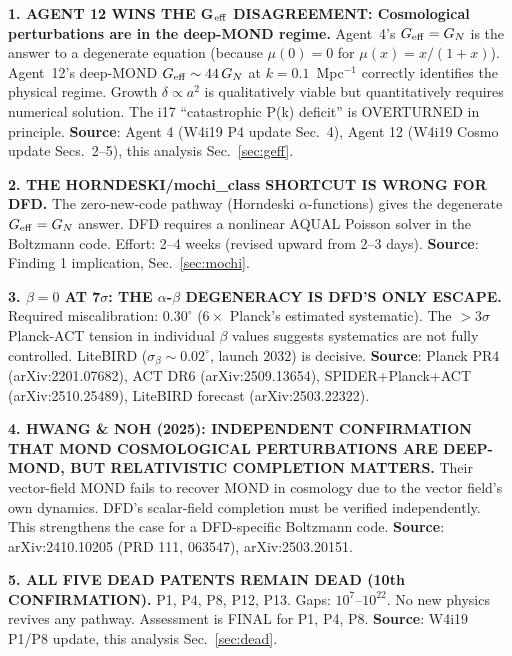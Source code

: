 \documentclass[11pt]{article}
\newcommand{\Geff}{G_{\rm eff}}
\newcommand{\GN}{G_N}
\begin{document}
\begin{tcolorbox}[colback=blue!5!white, colframe=blue!70!black,
  title=\textbf{W4i20 TOP 5 FINDINGS}]

\textbf{1. AGENT 12 WINS THE G$_{\rm eff}$ DISAGREEMENT: Cosmological
  perturbations are in the deep-MOND regime.}
Agent~4's $\Geff = \GN$ is the answer to a degenerate equation (because
$\mu(0) = 0$ for $\mu(x) = x/(1+x)$). Agent~12's deep-MOND
$\Geff \sim 44\,\GN$ at $k = 0.1$~Mpc$^{-1}$ correctly identifies the
physical regime. Growth $\delta \propto a^2$ is qualitatively viable but
quantitatively requires numerical solution. The i17 ``catastrophic P(k)
deficit'' is OVERTURNED in principle.
\textbf{Source}: Agent 4 (W4i19 P4 update Sec.~4), Agent 12 (W4i19 Cosmo
update Secs.~2--5), this analysis Sec.~\ref{sec:geff}.

\textbf{2. THE HORNDESKI/mochi\_class SHORTCUT IS WRONG FOR DFD.}
The zero-new-code pathway (Horndeski $\alpha$-functions) gives the degenerate
$\Geff = \GN$ answer. DFD requires a nonlinear AQUAL Poisson solver in
the Boltzmann code. Effort: 2--4 weeks (revised upward from 2--3 days).
\textbf{Source}: Finding 1 implication, Sec.~\ref{sec:mochi}.

\textbf{3. $\beta = 0$ AT 7$\sigma$: THE $\alpha$-$\beta$ DEGENERACY IS
  DFD'S ONLY ESCAPE.}
Required miscalibration: $0.30^\circ$ ($6\times$ Planck's estimated
systematic). The $>$3$\sigma$ Planck-ACT tension in individual $\beta$
values suggests systematics are not fully controlled. LiteBIRD
($\sigma_\beta \sim 0.02^\circ$, launch 2032) is decisive.
\textbf{Source}: Planck PR4 (arXiv:2201.07682), ACT DR6 (arXiv:2509.13654),
SPIDER+Planck+ACT (arXiv:2510.25489), LiteBIRD forecast (arXiv:2503.22322).

\textbf{4. HWANG \& NOH (2025): INDEPENDENT CONFIRMATION THAT MOND
  COSMOLOGICAL PERTURBATIONS ARE DEEP-MOND, BUT RELATIVISTIC COMPLETION
  MATTERS.}
Their vector-field MOND fails to recover MOND in cosmology due to the
vector field's own dynamics. DFD's scalar-field completion must be verified
independently. This strengthens the case for a DFD-specific Boltzmann code.
\textbf{Source}: arXiv:2410.10205 (PRD 111, 063547), arXiv:2503.20151.

\textbf{5. ALL FIVE DEAD PATENTS REMAIN DEAD (10th CONFIRMATION).}
P1, P4, P8, P12, P13. Gaps: $10^{7}$--$10^{22}$. No new physics revives
any pathway. Assessment is FINAL for P1, P4, P8.
\textbf{Source}: W4i19 P1/P8 update, this analysis Sec.~\ref{sec:dead}.

\end{tcolorbox}
\end{document}
